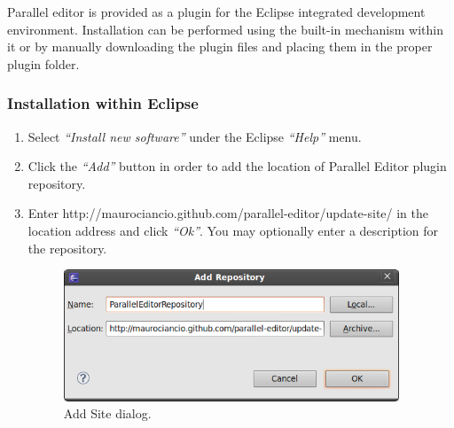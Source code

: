 
Parallel editor is provided as a plugin for the Eclipse integrated development environment. 
Installation can be performed using the built-in mechanism within it or by manually downloading
the plugin files and placing them in the proper plugin folder.

\subsubsection{Installation within Eclipse}

\begin{enumerate}
\item
  Select \emph{``Install new software''} under the Eclipse
  \emph{``Help''} menu.

\item
  Click the \emph{``Add''} button in order to add the location of
  Parallel Editor plugin repository.

\item
  Enter http://maurociancio.github.com/parallel-editor/update-site/
  in the location address and click \emph{``Ok''}. You may optionally
  enter a description for the repository.
  
  \begin{figure}[!ht]
	\begin{center}
		\includegraphics[width=10cm]{addsite.png}
		\caption{\label{addsite} Add Site dialog.}
	\end{center}
  \end{figure}


\end{enumerate}
